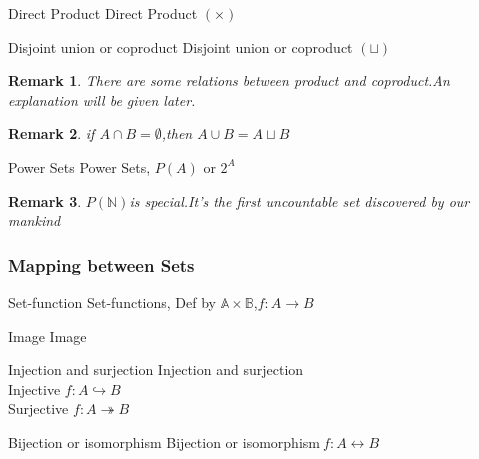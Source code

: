 \documentclass[13pt, a4paper, oneside]{book}
\newtheorem{remark}{Remark}[section]
\begin{document}
	\begin{definition}{Direct Product}{}
		Direct Product $ \left( \times \right) $
	\end{definition}
	
	\begin{definition}{Disjoint union or coproduct}{}
		Disjoint union or coproduct $ \left( \sqcup \right) $
	\end{definition}
	
	\begin{remark}
		There are some relations between product and coproduct.An explanation will be given later.
	\end{remark}
	
	\begin{remark}
		if $A \cap B = \emptyset $,then $ A \cup B = A \sqcup B $
	\end{remark}
	
	\begin{definition}{Power Sets}{}
		Power Sets, $P(A)$ or $ 2^{A} $
	\end{definition}
	
	\begin{remark}
		$P(\mathbb{N})$is special.It's the first uncountable set discovered by our mankind
	\end{remark}

	\subsubsection{Mapping between Sets}  %
	
	\begin{definition}{Set-function}{}
		Set-functions, Def by $\mathbb{A} \times \mathbb{B}$,$f:A \rightarrow B$\\
	\end{definition}
	
	\begin{definition}{Image}{}
		Image
	\end{definition}
	
	\begin{definition}{Injection and surjection}{}
		Injection and surjection \\
		Injective $f: A \hookrightarrow B$ \\
		Surjective $ f: A \twoheadrightarrow B $
	\end{definition}
	
	\begin{definition}{Bijection or isomorphism}{}
		Bijection or isomorphism$~ f: A \leftrightarrow B $\\
	\end{definition}
	
\end{document}
